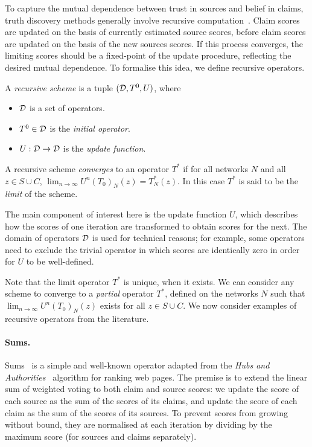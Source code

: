 To capture the mutual dependence between trust in sources and belief in claims,
truth discovery methods generally involve recursive
computation~\cite{pasternack2010,yin2008,yang_probabilistic_2019,du2019,zhang2018,li2016,galland2010,zhi2015}.
Claim scores are updated on the basis of currently estimated source scores,
before claim scores are updated on the basis of the new sources scores. If this
process converges, the limiting scores should be a fixed-point of the update
procedure, reflecting the desired mutual dependence. To formalise this idea, we
define recursive operators.

\begin{definition}
    \label{td_new_def_recursive_scheme}
    A \emph{recursive scheme} is a tuple $(\mathcal{D}, T^0, U)$, where
    \begin{itemize}
        \item $\mathcal{D}$ is a set of operators.
        \item $T^0 \in \mathcal{D}$ is the \emph{initial operator}.
        \item $U: \mathcal{D} \to \mathcal{D}$ is the \emph{update function}.
    \end{itemize}
    A recursive scheme \emph{converges} to an operator $T^*$ if for all
    networks $N$ and all $z \in S \cup C$, $\lim_{n \to \infty}{U^n(T_0)_N(z)}
    = T^*_N(z)$. In this case $T^*$ is said to be the \emph{limit} of the
    scheme.
\end{definition}

The main component of interest here is the update function $U$, which describes
how the scores of one iteration are transformed to obtain scores for the next.
The domain of operators $\mathcal{D}$ is used for technical reasons; for example, some
operators need to exclude the trivial operator in which scores are identically
zero in order for $U$ to be well-defined.

Note that the limit operator $T^*$ is unique, when it exists. We can consider
any scheme to converge to a \emph{partial} operator $T^*$, defined on the
networks $N$ such that $\lim_{n \to \infty}{U^n(T_0)_N(z)}$ exists for all $z
\in S \cup C$. We now consider examples of recursive operators from the
literature.

\paragraph{Sums.}

Sums~\cite{pasternack2010} is a simple and well-known operator adapted from the
\emph{Hubs and Authorities}~\cite{kleinberg1999} algorithm for ranking web
pages. The premise is to extend the linear sum of weighted voting to both claim
and source scores: we update the score of each source as the sum of the scores
of its claims, and update the score of each claim as the sum of the scores of
its sources. To prevent scores from growing without bound, they are normalised
at each iteration by dividing by the maximum score (for sources and claims
separately).

